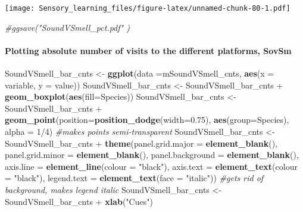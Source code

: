 \documentclass[]{article}
\newenvironment{Shaded}{\begin{snugshade}}{\end{snugshade}}
\newcommand{\KeywordTok}[1]{\textcolor[rgb]{0.13,0.29,0.53}{\textbf{{#1}}}}
\newcommand{\DataTypeTok}[1]{\textcolor[rgb]{0.13,0.29,0.53}{{#1}}}
\newcommand{\DecValTok}[1]{\textcolor[rgb]{0.00,0.00,0.81}{{#1}}}
\newcommand{\FloatTok}[1]{\textcolor[rgb]{0.00,0.00,0.81}{{#1}}}
\newcommand{\StringTok}[1]{\textcolor[rgb]{0.31,0.60,0.02}{{#1}}}
\newcommand{\CommentTok}[1]{\textcolor[rgb]{0.56,0.35,0.01}{\textit{{#1}}}}
\newcommand{\NormalTok}[1]{{#1}}
\let\oldparagraph\paragraph
\renewcommand{\paragraph}[1]{\oldparagraph{#1}\mbox{}}
\begin{document}
\texttt{[image: Sensory\_learning\_files/figure-latex/unnamed-chunk-80-1.pdf]}

\begin{Shaded}
\begin{Highlighting}[]
\CommentTok{#ggsave("SoundVSmell_pct.pdf"  )}
\end{Highlighting}
\end{Shaded}

\paragraph{Plotting absolute number of visits to the different
platforms,
SovSm}\label{plotting-absolute-number-of-visits-to-the-different-platforms-sovsm}

\begin{Shaded}
\begin{Highlighting}[]
\NormalTok{SoundVSmell_bar_cnts <-}\StringTok{ }\KeywordTok{ggplot}\NormalTok{(}\DataTypeTok{data =}\NormalTok{mSoundVSmell_cnts, }\KeywordTok{aes}\NormalTok{(}\DataTypeTok{x =} \NormalTok{variable, }\DataTypeTok{y =} \NormalTok{value))}
\NormalTok{SoundVSmell_bar_cnts <-}\StringTok{ }\NormalTok{SoundVSmell_bar_cnts +}\StringTok{ }\KeywordTok{geom_boxplot}\NormalTok{(}\KeywordTok{aes}\NormalTok{(}\DataTypeTok{fill=}\NormalTok{Species))}
\NormalTok{SoundVSmell_bar_cnts <-}\StringTok{ }\NormalTok{SoundVSmell_bar_cnts +}\StringTok{ }\KeywordTok{geom_point}\NormalTok{(}\DataTypeTok{position=}\KeywordTok{position_dodge}\NormalTok{(}\DataTypeTok{width=}\FloatTok{0.75}\NormalTok{), }\KeywordTok{aes}\NormalTok{(}\DataTypeTok{group=}\NormalTok{Species), }\DataTypeTok{alpha =} \DecValTok{1}\NormalTok{/}\DecValTok{4}\NormalTok{) }\CommentTok{#makes points semi-transparent}
\NormalTok{SoundVSmell_bar_cnts <-}\StringTok{ }\NormalTok{SoundVSmell_bar_cnts +}\StringTok{ }\KeywordTok{theme}\NormalTok{(}\DataTypeTok{panel.grid.major =} \KeywordTok{element_blank}\NormalTok{(), }\DataTypeTok{panel.grid.minor =} \KeywordTok{element_blank}\NormalTok{(),}
\DataTypeTok{panel.background =} \KeywordTok{element_blank}\NormalTok{(), }\DataTypeTok{axis.line =} \KeywordTok{element_line}\NormalTok{(}\DataTypeTok{colour =} \StringTok{"black"}\NormalTok{), }\DataTypeTok{axis.text =} \KeywordTok{element_text}\NormalTok{(}\DataTypeTok{colour =} \StringTok{"black"}\NormalTok{), }\DataTypeTok{legend.text =} \KeywordTok{element_text}\NormalTok{(}\DataTypeTok{face =} \StringTok{"italic"}\NormalTok{))  }\CommentTok{#gets rid of background, makes legend italic}
\NormalTok{SoundVSmell_bar_cnts <-}\StringTok{ }\NormalTok{SoundVSmell_bar_cnts +}\StringTok{ }\KeywordTok{xlab}\NormalTok{(}\StringTok{"Cues"}\NormalTok{)}

\end{Highlighting}
\end{Shaded}
\end{document}
